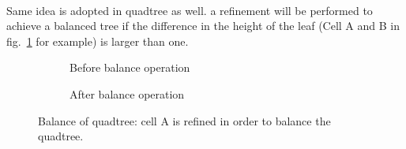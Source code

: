 \paragraph{}
Same idea is adopted in quadtree as well.
a refinement will be performed to achieve a balanced tree if the difference in the height of the leaf (Cell A and B in fig.~\ref{qdt_fig:tree_balance_quadtree} for example) is larger than one.
    \begin{figure}[!ht]
        \begin{subfigure}[b]{0.5\linewidth}
            \centering
            \caption{Before balance operation}
        \end{subfigure}
        \begin{subfigure}[b]{0.5\linewidth}
            \centering
            \caption{After balance operation}
        \end{subfigure}
        \caption{Balance of quadtree: cell A is refined in order to balance the quadtree.}
        \label{qdt_fig:tree_balance_quadtree}
    \end{figure}

